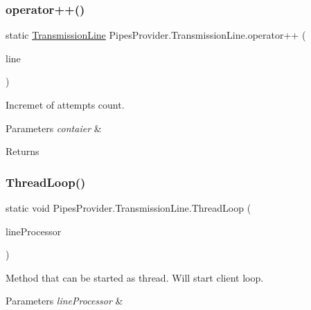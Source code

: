 \subsubsection{\texorpdfstring{operator++()}{operator++()}}
{\footnotesize\ttfamily static \mbox{\hyperlink{class_pipes_provider_1_1_transmission_line}{Transmission\+Line}} Pipes\+Provider.\+Transmission\+Line.\+operator++ (\begin{DoxyParamCaption}\item[{\mbox{\hyperlink{class_pipes_provider_1_1_transmission_line}{Transmission\+Line}}}]{line }\end{DoxyParamCaption})\hspace{0.3cm}{\ttfamily [static]}}



Incremet of attempts count. 


\begin{DoxyParams}{Parameters}
{\em contaier} & \\
\hline
\end{DoxyParams}
\begin{DoxyReturn}{Returns}

\end{DoxyReturn}
\mbox{\label{class_pipes_provider_1_1_transmission_line_ab56219b10bad03085b5d23e48ad59ec3}} 
\subsubsection{\texorpdfstring{Thread\+Loop()}{ThreadLoop()}}
{\footnotesize\ttfamily static void Pipes\+Provider.\+Transmission\+Line.\+Thread\+Loop (\begin{DoxyParamCaption}\item[{object}]{line\+Processor }\end{DoxyParamCaption})\hspace{0.3cm}{\ttfamily [static]}}



Method that can be started as thread. Will start client loop. 


\begin{DoxyParams}{Parameters}
{\em line\+Processor} & \\
\hline
\end{DoxyParams}
\mbox{\label{class_pipes_provider_1_1_transmission_line_acc672e0d0c921f60a9a5920e3f76d28b}} 
